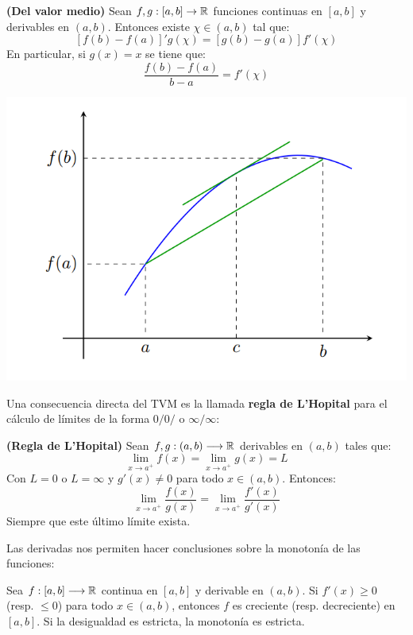 \begin{teorema}
	\textbf{(Del valor medio)}
	Sean $f, g: [a,b] \rightarrow \mathbb{R}$ funciones continuas en $[a,b]$ y derivables en $(a,b)$. Entonces existe $\chi \in (a,b)$ tal que: 
	$$ [f(b) - f(a)]' g(\chi) = [g(b) - g(a)]f'(\chi) $$
	En particular, si $g(x) = x$ se tiene que: 
	$$ \dfrac{f(b) - f(a)}{b - a} = f'(\chi) $$ 
\end{teorema}

\begin{center}
	\includegraphics[scale=0.5]{figuras/capitulo1/05-derivadas/tvm.png}
\end{center}

Una consecuencia directa del TVM es la llamada \textbf{regla de L'Hopital} para el cálculo de límites de la forma $0/0/$ o $\infty /\infty$:

\begin{teorema}
	\textbf{(Regla de L'Hopital)}
	Sean $f,g:(a,b)\longrightarrow \mathbb{R}$ derivables en $(a,b)$ tales que: 
	$$ \lim_{x\rightarrow a^+} f(x) = \lim_{x\rightarrow a^+} g(x) = L $$ 
	Con $L = 0$ o $L = \infty$ y $g'(x) \neq 0$ para todo $x \in (a,b)$. Entonces: 
	$$ \lim_{x\rightarrow a^+} \dfrac{f(x)}{g(x)} = \lim_{x\rightarrow a^+} \dfrac{f'(x)}{g'(x)} $$ 
	Siempre que este último límite exista. 
\end{teorema}


Las derivadas nos permiten hacer conclusiones sobre la monotonía de las funciones:
\begin{proposicion}		
	Sea $f:[a,b] \longrightarrow \mathbb{R}$ continua en $[a,b]$ y derivable en $(a,b)$. Si $f'(x) \geq  0$ (resp. $\leq 0$) para todo $x \in (a,b)$, entonces $f$ es creciente (resp. decreciente) en $[a,b]$. Si la desigualdad es estricta, la monotonía es estricta. 
\end{proposicion}